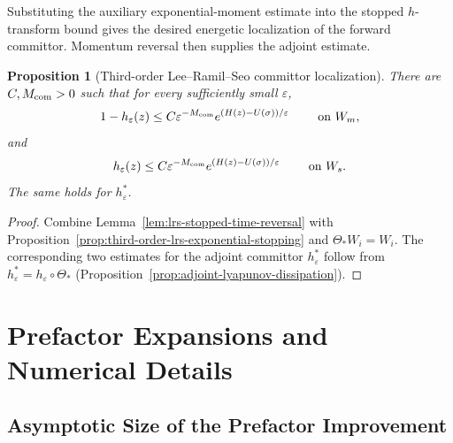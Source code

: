 \documentclass[11pt]{article}
\numberwithin{equation}{section}
\theoremstyle{plain}
\newtheorem{proposition}[theorem]{Proposition}
\theoremstyle{definition}
\theoremstyle{remark}
\newcommand{\eps}{\varepsilon}
\begin{document}
Substituting the auxiliary exponential-moment estimate into the
stopped $h$-transform bound gives the desired energetic localization of the
forward committor.  Momentum reversal then supplies the adjoint estimate.

\begin{proposition}[Third-order Lee--Ramil--Seo committor localization]
\label{prop:third-order-lrs-committor-localization}
There are $C,M_{\rm com}>0$ such that for every sufficiently small $\eps$,
\[
1-h_\eps(z)\le C\eps^{-M_{\rm com}}e^{(H(z)-U(\sigma))/\eps}\qquad\text{ on $W_m$},
\]
and
\[
h_\eps(z)\le C\eps^{-M_{\rm com}}e^{(H(z)-U(\sigma))/\eps}\qquad\text{ on $W_s$}.
\]
The same holds
for $h_\eps^*$.
\end{proposition}

\begin{proof}
Combine Lemma~\ref{lem:lrs-stopped-time-reversal} with
Proposition~\ref{prop:third-order-lrs-exponential-stopping} and
$\Theta_*W_i=W_i$.  The corresponding two estimates for the adjoint
committor $h_\eps^*$ follow from $h_\eps^*=h_\eps\circ\Theta_*$
(Proposition~\ref{prop:adjoint-lyapunov-dissipation}).
\end{proof}

\section{Prefactor Expansions and Numerical Details}
\label{app:prefactor-numerics}
\label{app:supplementary}

\subsection{Asymptotic Size of the Prefactor Improvement}
\label{app:prefactor-expansions}
\end{document}
